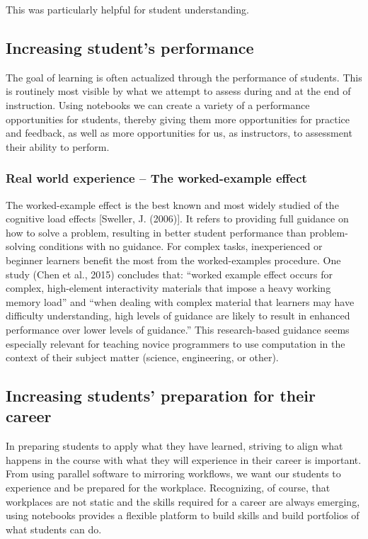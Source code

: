 \documentclass[]{book}
\begin{document}
This was particularly helpful for student understanding.

\subsection{Increasing student's
performance}\label{increasing-students-performance}

The goal of learning is often actualized through the performance of
students. This is routinely most visible by what we attempt to assess
during and at the end of instruction. Using notebooks we can create a
variety of a performance opportunities for students, thereby giving them
more opportunities for practice and feedback, as well as more
opportunities for us, as instructors, to assessment their ability to
perform.

\subsubsection{Real world experience -- The worked-example
effect}\label{real-world-experience-the-worked-example-effect}

The worked-example effect is the best known and most widely studied of
the cognitive load effects {[}Sweller, J. (2006){]}. It refers to
providing full guidance on how to solve a problem, resulting in better
student performance than problem-solving conditions with no guidance.
For complex tasks, inexperienced or beginner learners benefit the most
from the worked-examples procedure. One study (Chen et al., 2015)
concludes that: ``worked example effect occurs for complex, high-element
interactivity materials that impose a heavy working memory load'' and
``when dealing with complex material that learners may have difficulty
understanding, high levels of guidance are likely to result in enhanced
performance over lower levels of guidance.'' This research-based
guidance seems especially relevant for teaching novice programmers to
use computation in the context of their subject matter (science,
engineering, or other).

\subsection{Increasing students' preparation for their
career}\label{increasing-students-preparation-for-their-career}

In preparing students to apply what they have learned, striving to align
what happens in the course with what they will experience in their
career is important. From using parallel software to mirroring
workflows, we want our students to experience and be prepared for the
workplace. Recognizing, of course, that workplaces are not static and
the skills required for a career are always emerging, using notebooks
provides a flexible platform to build skills and build portfolios of
what students can do.
\end{document}
